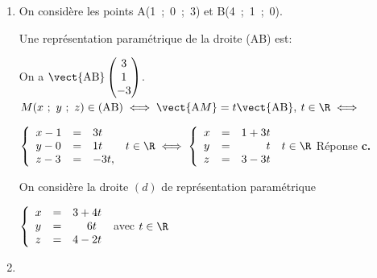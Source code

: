 \medskip















\begin{enumerate}
\item On considère les points A(1~;~0~;~3) et B(4~;~1~;~0).

Une représentation paramétrique de la droite (AB) est:























On a $\vect{\text{AB}}\begin{pmatrix}3\\1\\-3\end{pmatrix}$.
$M(x~;~y~;~z) \in (\text{AB}) \iff \vect{\text{A}M} = t\vect{\text{AB}}, \: t \in \R \iff $

$\left\{\begin{array}{l c l}x - 1&=&3t\\y - 0&=&1t\\z - 3&=&- 3t, \end{array}\right. \: t \in \R\iff \left\{\begin{array}{l c l}
x &=& 1 + 3t\\
y &=&\phantom{1 + 3}t\\
z&=&3 - 3t
\end{array}\right.\: t \in \R$ Réponse \textbf{c.~}

On considère la droite $(d)$ de représentation paramétrique 

$\left\{\begin{array}{l c l}
x&=&3 + 4t\\
y&=&\phantom{3 + }6t\\
z&=&4 - 2 t
\end{array}\right.$ avec $t \in \R$

\item 






\end{enumerate}
